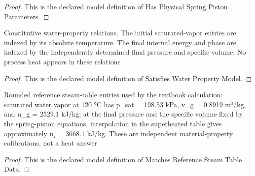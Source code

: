 \begin{proof}
  This is the declared model definition of Has Physical Spring Piston Parameters.
\end{proof}
\begin{definition}
  \label{def:physics:phyx-mini-0452:phyxminiproblems-problemphyxmini0452-satisfieswaterpropertymodel}
  Constitutive water-property relations. The initial saturated-vapor entries are indexed by its absolute temperature. The final internal energy and phase are indexed by the independently determined final pressure and specific volume. No process heat appears in these relations
\end{definition}
\begin{proof}
  This is the declared model definition of Satisfies Water Property Model.
\end{proof}
\begin{definition}
  \label{def:physics:phyx-mini-0452:phyxminiproblems-problemphyxmini0452-matchesreferencesteamtabledata}
  Rounded reference steam-table entries used by the textbook calculation: saturated water vapor at 120 °C has p\_sat = 198.53 kPa, v\_g = 0.8919 m³/kg, and u\_g = 2529.1 kJ/kg; at the final pressure and the specific volume fixed by the spring-piston equations, interpolation in the superheated table gives approximately u₂ = 3668.1 kJ/kg. These are independent material-property calibrations, not a heat answer
\end{definition}
\begin{proof}
  This is the declared model definition of Matches Reference Steam Table Data.
\end{proof}
